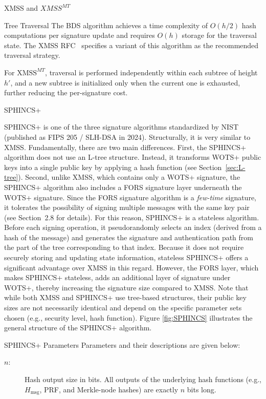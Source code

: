 \documentclass[version=preprint]{iacrcc}
\begin{document}
\begin{section}{XMSS and \texorpdfstring{$XMSS^{MT}$}{XMSS MT}}
\begin{subsection}{Tree Traversal}
    The BDS algorithm achieves a time complexity of $O(h / 2)$ hash computations per signature update and requires $O(h)$ storage for the traversal state. The XMSS RFC~\cite{huelsing2018rfc} specifies a variant of this algorithm as the recommended traversal strategy.

    For $\text{XMSS}^{MT}$, traversal is performed independently within each subtree of height $h'$, and a new subtree is initialized only when the current one is exhausted, further reducing the per-signature cost.

    \end{subsection}
\end{section}

\begin{section}{SPHINCS+}

    SPHINCS+ \cite{gaithersburgmdnist_2024_stateless} is one of the three signature algorithms standardized by NIST (published as FIPS 205 / SLH-DSA in 2024). Structurally, it is very similar to XMSS. Fundamentally, there are two main differences. First, the SPHINCS+ algorithm does not use an L-tree structure. Instead, it transforms WOTS+ public keys into a single public key by applying a hash function (see Section~\ref{sec:L-tree}). Second, unlike XMSS, which contains only a WOTS+ signature, the SPHINCS+ algorithm also includes a FORS signature layer underneath the WOTS+ signature. Since the FORS signature algorithm is a \emph{few-time} signature, it tolerates the possibility of signing multiple messages with the same key pair (see Section~2.8 for details). For this reason, SPHINCS+ is a stateless algorithm. Before each signing operation, it pseudorandomly selects an index (derived from a hash of the message) and generates the signature and authentication path from the part of the tree corresponding to that index. Because it does not require securely storing and updating state information, stateless SPHINCS+ offers a significant advantage over XMSS in this regard. However, the FORS layer, which makes SPHINCS+ stateless, adds an additional layer of signature under WOTS+, thereby increasing the signature size compared to XMSS. Note that while both XMSS and SPHINCS+ use tree-based structures, their public key sizes are not necessarily identical and depend on the specific parameter sets chosen (e.g., security level, hash function). Figure \ref{fig:SPHINCS} illustrates the general structure of the SPHINCS+ algorithm. 
    \begin{subsection}{SPHINCS+ Parameters}
        Parameters and their descriptions are given below: 
    \begin{description}
  \item[$n$:] Hash output size in bits. All outputs of the underlying hash functions (e.g., $H_{\mathrm{msg}}$, PRF, and Merkle-node hashes) are exactly $n$ bits long.
  

\end{description}
\end{subsection}
\end{section}
\end{document}
